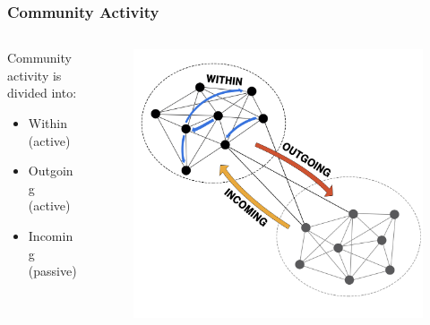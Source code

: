\documentclass{beamer}
\begin{document}
\begin{frame}
\frametitle{Community Activity}
\begin{columns}
	\begin{column}{0.3\textwidth}
	Community activity is divided into:
		\begin{itemize}
			\item Within (active) 
			\item Outgoing (active)
			\item Incoming (passive)
		\end{itemize}
	\end{column}
	\begin{column}{0.65\textwidth}
		\begin{figure}[r]
			\includegraphics[width=1\linewidth]{figures/activity}
		\end{figure}
	\end{column}
\end{columns}
\end{frame}

\end{document}
